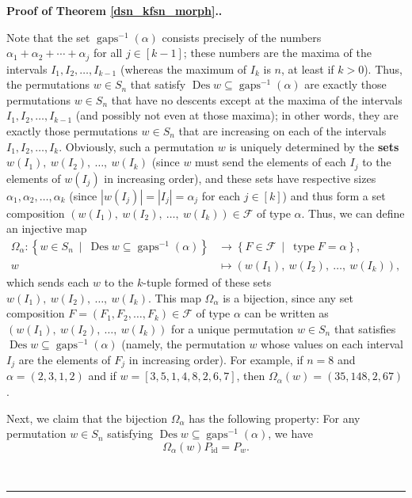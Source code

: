 \documentclass[12pt]{article}
\theoremstyle{definition}%
\theoremstyle{definition}%
\theoremstyle{remark}%
\newcommand{\tup}[1]{\left( #1 \right)}
\newcommand{\interval}[1]{\left[ #1 \right]} %
\newcommand{\ponl}[1]{\left[ #1 \right]} %
\newcommand{\set}[1]{\left\{ #1 \right\}}
\newcommand{\card}[1]{\left| #1 \right|} %
\newcommand{\CF}{\mathcal{F}}
\newcommand{\Omal}{\Omega_{\alpha}}
\newcommand{\Des}{\operatorname{Des}}
\newcommand{\gaps}{\operatorname{gaps}}
\newcommand{\type}{\operatorname{type}}
\newcommand{\id}{\operatorname{id}}
\newenvironment{proof}[1][Proof]{\noindent\textbf{#1.} }{\ \rule{0.5em}{0.5em}}
\begin{document}
\begin{proof}[Proof of Theorem \ref{dsn_kfsn_morph}.]
\begin{enumerate}
Note that the set $\gaps^{-1}\tup{\alpha}$
consists precisely of the numbers $\alpha_{1}+\alpha_{2}+\cdots+\alpha_{j}$
for all $j\in \interval{k-1}$; these numbers are the maxima of the
intervals $I_{1},I_{2},\ldots,I_{k-1}$ (whereas the maximum of $I_{k}$ is
$n$, at least if $k>0$). Thus, the permutations $w\in S_n$ that satisfy
$\Des w \subseteq\gaps^{-1}\tup{\alpha}$ are
exactly those permutations $w\in S_n$ that have no descents except at the
maxima of the intervals $I_{1},I_{2},\ldots,I_{k-1}$ (and possibly not even at
those maxima); in other words, they are exactly those permutations $w\in
S_n$ that are increasing on each of the intervals $I_{1},I_{2}%
,\ldots,I_{k}$. Obviously, such a permutation $w$ is
uniquely determined by the \textbf{sets}
$w \tup{I_1},\ w \tup{I_2},\ \ldots, \ w \tup{I_k}$
(since $w$ must send the elements of each $I_j$ to the elements of
$w\tup{I_j}$ in increasing order), and these sets have respective sizes
$\alpha_{1}, \alpha_{2}, \ldots, \alpha_{k}$
(since $\card{w \tup{I_j}} = \card{I_j} = \alpha_j$
for each $j \in \interval{k}$)
and thus form a set composition $\left(
w \tup{I_1},\ w \tup{I_2},\ \ldots, \ w \tup{I_k}
\right)  \in\CF$ of type $\alpha$.
Thus, we can define an injective map
\begin{align*}
\Omal : \set{ w\in S_n\ \mid\ \Des w\subseteq
\gaps^{-1}\tup{\alpha} }   &
\to \set{ F\in\CF\ \mid\ \type F=\alpha } ,\\
w &  \mapsto\left(
w \tup{I_1},\ w \tup{I_2},\ \ldots, \ w \tup{I_k}
\right)  ,
\end{align*}
which sends each $w$ to the $k$-tuple formed of these sets $w\left(
I_{1}\right)  ,\ w\left(  I_{2}\right)  ,\ \ldots,\ w\left(  I_{k}\right)$.
This map $\Omal$ is a bijection, since any set composition $F
= \left(  F_{1},F_{2},\ldots,F_{k}\right)  \in\CF$ of type
$\alpha$ can be written as
$\left( w \tup{I_1},\ w \tup{I_2},\ \ldots, \ w \tup{I_k}
 \right)$ for a unique permutation $w\in S_n$ that satisfies
$\Des w\subseteq\gaps^{-1}\left(
\alpha\right)$ (namely, the permutation $w$ whose values on each interval
$I_{j}$ are the elements of $F_{j}$ in increasing order).
For example, if $n = 8$ and $\alpha = \tup{2,3,1,2}$ and
if $w = \ponl{3, 5, 1, 4, 8, 2, 6, 7}$, then
$\Omal \tup{w} = \tup{35, 148, 2, 67}$.

Next, we claim that the bijection $\Omal$ has the following
property: For any permutation $w\in S_n$ satisfying
$\Des w\subseteq\gaps^{-1}\tup{\alpha}$, we have
\begin{equation}
\Omal \tup{w}  P_{\id} = P_w .
\label{pf.eq.lem.rho.monoid.rhobs.4}
\end{equation}



\end{enumerate}
\end{proof}
\end{document}
